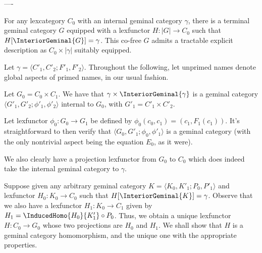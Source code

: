 \closeDetails

----


\begin{construction}
For any lexcategory $C_0$ with an internal geminal category $\gamma$, there is a terminal geminal category $G$ equipped with a lexfunctor $H : |G| \to C_0$ such that $H[\InteriorGeminal{G}] = \gamma$. This co-free $G$ admits a tractable explicit description as $C_0 \times |\gamma|$ suitably equipped.
\end{construction}
\openDetails
Let $\gamma = \langle C'_1, C'_2; F'_1, F'_2 \rangle$. Throughout the following, let unprimed names denote global aspects of primed names, in our usual fashion.

Let $G_0 = C_0 \times C_1$. We have that $\gamma \times \InteriorGeminal{\gamma}$ is a geminal category $\langle G'_1, G'_2; \phi'_1, \phi'_2 \rangle$ internal to $G_0$, with $G'_1 = C'_1 \times C'_2$. 

Let lexfunctor $\phi_0 : G_0 \to G_1$ be defined by $\phi_0(c_0, c_1) = (c_1, F_1(c_1))$. It's straightforward to then verify that $\langle G_0, G'_1; \phi_0, \phi'_1 \rangle$ is a geminal category (with the only nontrivial aspect being the equation $E_0$, as it were).

We also clearly have a projection lexfunctor from $G_0$ to $C_0$ which does indeed take the internal geminal category to $\gamma$.


Suppose given any arbitrary geminal category $K = \langle K_0, K'_1; P_0, P'_1 \rangle$ and lexfunctor $H_0 : K_0 \to C_0$ such that $H[\InteriorGeminal{K}] = \gamma$. Observe that we also have a lexfunctor $H_1 : K_0 \to C_1$ given by $H_1 = \InducedHomo{H_0}{K'_1} \circ P_0$. Thus, we obtain a unique lexfunctor $H : C_0 \to G_0$ whose two projections are $H_0$ and $H_1$. We shall show that $H$ is a geminal category homomorphism, and the unique one with the appropriate properties. \TODO
\closeDetails


